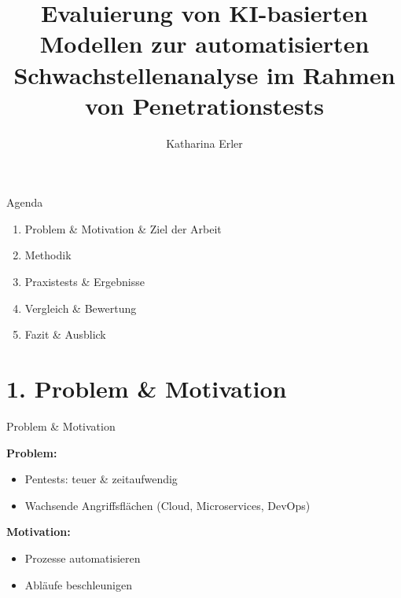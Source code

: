 \documentclass[
	aspectratio=169,	%
	onlytextwidth,		%
	t,					%
	]{beamer}
\title{Evaluierung von KI-basierten Modellen zur automatisierten Schwachstellenanalyse im Rahmen von Penetrationstests}
\author[Katharina Erler]{Katharina Erler}
\begin{document}
	
\begin{frame}{Agenda}
	\begin{enumerate}
		\item Problem \& Motivation \& Ziel der Arbeit
		\item Methodik
		\item Praxistests \& Ergebnisse
		\item Vergleich \& Bewertung
		\item Fazit \& Ausblick
	\end{enumerate}
\end{frame}


\section{1. Problem \& Motivation}
\begin{frame}{Problem \& Motivation}
	
	\textbf{Problem:}
	\begin{itemize}
		\item Pentests: teuer \& zeitaufwendig
		\item Wachsende Angriffsflächen (Cloud, Microservices, DevOps)
	\end{itemize}
	
	\vspace{0.5cm} 
	\textbf{Motivation:}
	\begin{itemize}
		\item Prozesse automatisieren
		\item Abläufe beschleunigen
		
	\end{itemize}
\end{frame}
\end{document}

